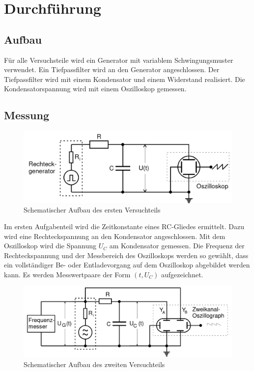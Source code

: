 \section{Durchführung}
\label{sec:Durchführung}


\subsection{Aufbau}
\label{sec:Aufbau}

Für alle Versuchsteile wird ein Generator mit variablem Schwingungsmuster verwendet. Ein Tiefpassfilter wird an den Generator angeschlossen.
Der Tiefpassfilter wird mit einem Kondensator und einem Widerstand realisiert. Die Kondensatorspannung wird mit einem Oszilloskop gemessen.

\subsection{Messung}
\label{sec:Messung}

\begin{figure}[h!]
    \centering
    \includegraphics[width=\linewidth]{img/Aufbau1.png}
    \caption{Schematischer Aufbau des ersten Versuchteils\cite{V353}}
    \label{fig:Aufbau1}
\end{figure}

Im ersten Aufgabenteil wird die Zeitkonstante eines RC-Gliedes ermittelt.
Dazu wird eine Rechteckspannung an den Kondensator angeschlossen. Mit dem Oszilloskop wird die Spannung $U_C$ am Kondensator gemessen. %
Die Frequenz der Rechteckspannung und der Messbereich des Oszilloskops werden so gewählt, dass ein vollständiger Be- oder Entladevorgang
auf dem Oszilloskop abgebildet werden kann. Es werden Messwertpaare der Form $(t, U_C)$ aufgezeichnet.\\

\begin{figure}[h!]
    \centering
    \includegraphics[width=\linewidth]{img/Aufbau2.png}
    \caption{Schematischer Aufbau des zweiten Versuchteils\cite{V353}}
    \label{fig:Aufbau2}
\end{figure}

